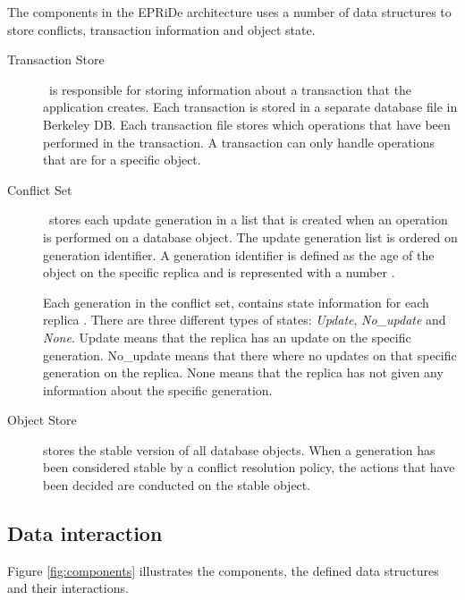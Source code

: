The components in the EPRiDe architecture uses a number of data structures to store conflicts, transaction information and object state. 
\begin{description}
	
	\item[Transaction Store] \
	is responsible for storing information about a transaction that the application creates. Each transaction is stored in a separate database file in Berkeley DB.  Each transaction file stores which operations that have been performed in the transaction. A transaction can only handle operations that are for a specific object.
	
	\item[Conflict Set] \
	stores each update generation in a list that is created when an operation is performed on a database object. The update generation list is ordered on generation identifier. A generation identifier is defined as the age of the object on the specific replica and is represented with a number \cite[]{Syber2007}.
	
	Each generation in the conflict set, contains state information for each replica \cite[]{Syber2007}. There are three different types of states: \emph{Update}, \emph{No\_update} and \emph{None}. Update means that the replica has an update on the specific generation. No\_update means that there where no updates on that specific generation on the replica. None means that the replica has not given any information about the specific generation. 
	
	\item[Object Store] stores the stable version of all database objects. When a generation has been considered stable by a conflict resolution policy, the actions that have been decided are conducted on the stable object.
	
\end{description}
     

\subsection{Data interaction} %
\label{sub:data_interaction}

Figure \ref{fig:components} illustrates the components, the defined data structures and their interactions. 

